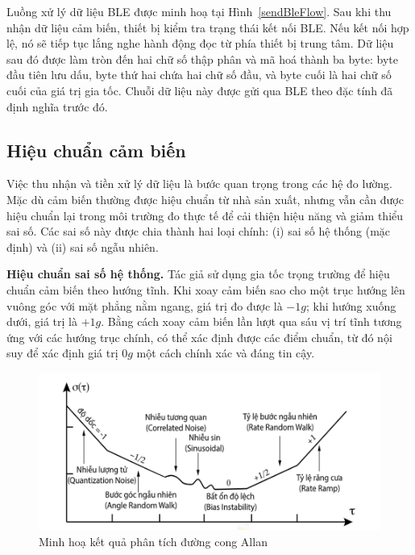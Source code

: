 Luồng xử lý dữ liệu BLE được minh hoạ tại Hình~\ref{sendBleFlow}. 
Sau khi thu nhận dữ liệu cảm biến, thiết bị kiểm tra trạng thái 
kết nối BLE. Nếu kết nối hợp lệ, nó sẽ tiếp tục lắng nghe hành động đọc 
từ phía thiết bị trung tâm. Dữ liệu sau đó được làm tròn đến hai chữ số 
thập phân và mã hoá thành ba byte: byte đầu tiên lưu dấu, byte thứ hai 
chứa hai chữ số đầu, và byte cuối là hai chữ số cuối của giá trị gia tốc. 
Chuỗi dữ liệu này được gửi qua BLE theo đặc tính đã định nghĩa trước đó.














\subsection{Hiệu chuẩn cảm biến}
Việc thu nhận và tiền xử lý dữ liệu là bước quan trọng trong các hệ đo 
lường. Mặc dù cảm biến thường được hiệu chuẩn từ nhà sản xuất, nhưng 
vẫn cần được hiệu chuẩn lại trong môi trường đo thực tế để cải thiện 
hiệu năng và giảm thiểu sai số. Các sai số này được chia thành hai 
loại chính: (i) sai số hệ thống (mặc định) và (ii) sai số ngẫu nhiên.

\textbf{Hiệu chuẩn sai số hệ thống.} Tác giả sử dụng gia tốc trọng trường 
để hiệu chuẩn cảm biến theo hướng tĩnh. Khi xoay cảm biến sao cho một 
trục hướng lên vuông góc với mặt phẳng nằm ngang, giá trị đo được 
là $-1g$; khi hướng xuống dưới, giá trị là $+1g$. Bằng cách xoay cảm 
biến lần lượt qua sáu vị trí tĩnh tương ứng với các hướng trục chính, 
có thể xác định được các điểm chuẩn, từ đó nội suy để xác định giá 
trị $0g$ một cách chính xác và đáng tin cậy.

\begin{figure}[htbp]
    \centering
    \includegraphics[width=\textwidth]{images/allan.png}
    \caption{Minh hoạ kết quả phân tích đường cong Allan}
    \label{allan}
\end{figure}

